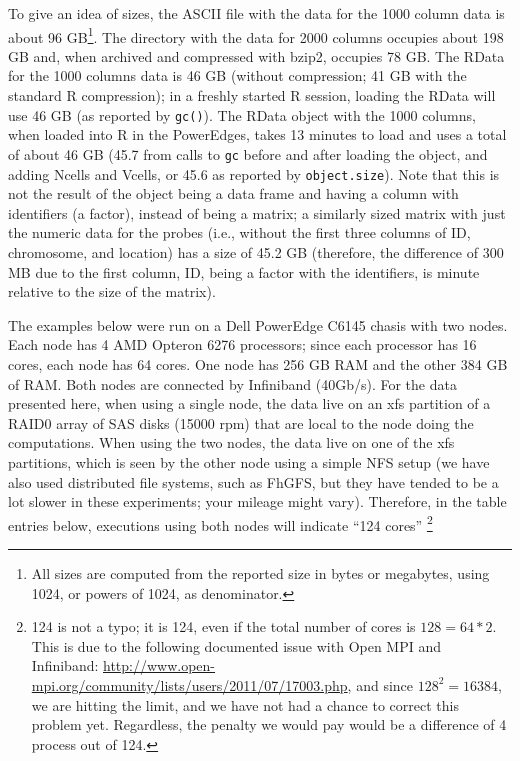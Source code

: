 \documentclass[a4paper,11pt]{article}
\begin{document}
To give an idea of sizes, the ASCII file with the data for the 1000 column
data is about 96 GB\footnote{All sizes are computed from the reported size
  in bytes or megabytes, using 1024, or powers of 1024, as
  denominator.}. The directory with the data for 2000 columns occupies
about 198 GB and, when archived and compressed with bzip2, occupies 78
GB. The RData for the 1000 columns data is 46 GB (without compression; 41
GB with the standard R compression); in a freshly started R session,
loading the RData will use 46 GB (as reported by \texttt{gc()}). The RData
object with the 1000 columns, when loaded into R in the PowerEdges, takes
13 minutes to load and uses a total of about 46 GB (45.7 from calls to
\texttt{gc} before and after loading the object, and adding Ncells and
Vcells, or 45.6 as reported by \texttt{object.size}). Note that this is
not the result of the object being a data frame and having a column with
identifiers (a factor), instead of being a matrix; a similarly sized
matrix with just the numeric data for the probes (i.e., without the first
three columns of ID, chromosome, and location) has a size of 45.2 GB
(therefore, the difference of 300 MB due to the first column, ID, being a
factor with the identifiers, is minute relative to the size of the
matrix).  
















The examples below were run on a Dell PowerEdge C6145 chasis with two
nodes. Each node has 4 AMD Opteron 6276 processors; since each processor
has 16 cores, each node has 64 cores. One node has 256 GB RAM and the
other 384 GB of RAM. Both nodes are connected by Infiniband (40Gb/s).  For
the data presented here, when using a single node, the data live on an xfs
partition of a RAID0 array of SAS disks (15000 rpm) that are local to the
node doing the computations. When using the two nodes, the data live on
one of the xfs partitions, which is seen by the other node using a simple
NFS setup (we have also used distributed file systems, such as FhGFS, but
they have tended to be a lot slower in these experiments; your mileage
might vary). Therefore, in the table entries below, executions using both
nodes will indicate ``124 cores'' \footnote{124 is not a typo; it is 124,
  even if the total number of cores is $128 = 64 * 2$. This is due to the
  following documented issue with Open MPI and Infiniband:
  \url{http://www.open-mpi.org/community/lists/users/2011/07/17003.php},
  and since $128^2 = 16384$, we are hitting the limit, and we have not had
  a chance to correct this problem yet. Regardless, the penalty we would
  pay would be a difference of 4 process out of 124.}
\end{document}
